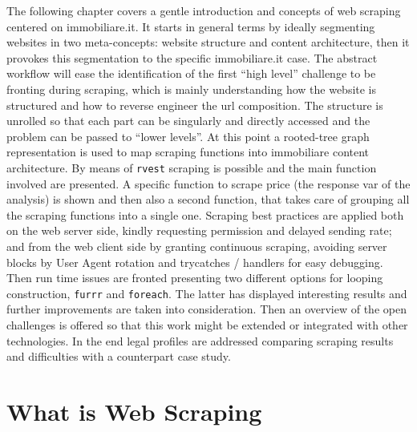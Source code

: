 \documentclass[
  12pt,
  a4paper,
  oneside]{book}
\theoremstyle{definition}
\theoremstyle{definition}
\theoremstyle{definition}
\theoremstyle{remark}
\begin{document}
The following chapter covers a gentle introduction and concepts of web scraping centered on immobiliare.it. It starts in general terms by ideally segmenting websites in two meta-concepts: website structure and content architecture, then it provokes this segmentation to the specific immobiliare.it case. The abstract workflow will ease the identification of the first ``high level'' challenge to be fronting during scraping, which is mainly understanding how the website is structured and how to reverse engineer the url composition. The structure is unrolled so that each part can be singularly and directly accessed and the problem can be passed to ``lower levels''. At this point a rooted-tree graph representation is used to map scraping functions into immobiliare content architecture. By means of \texttt{rvest} scraping is possible and the main function involved are presented. A specific function to scrape price (the response var of the analysis) is shown and then also a second function, that takes care of grouping all the scraping functions into a single one. Scraping best practices are applied both on the web server side, kindly requesting permission and delayed sending rate; and from the web client side by granting continuous scraping, avoiding server blocks by User Agent rotation and trycatches / handlers for easy debugging. Then run time issues are fronted presenting two different options for looping construction, \texttt{furrr} and \texttt{foreach}. The latter has displayed interesting results and further improvements are taken into consideration. Then an overview of the open challenges is offered so that this work might be extended or integrated with other technologies. In the end legal profiles are addressed comparing scraping results and difficulties with a counterpart case study.

\hypertarget{what-is-web-scraping}{%
\section{What is Web Scraping}\label{what-is-web-scraping}}
\end{document}
